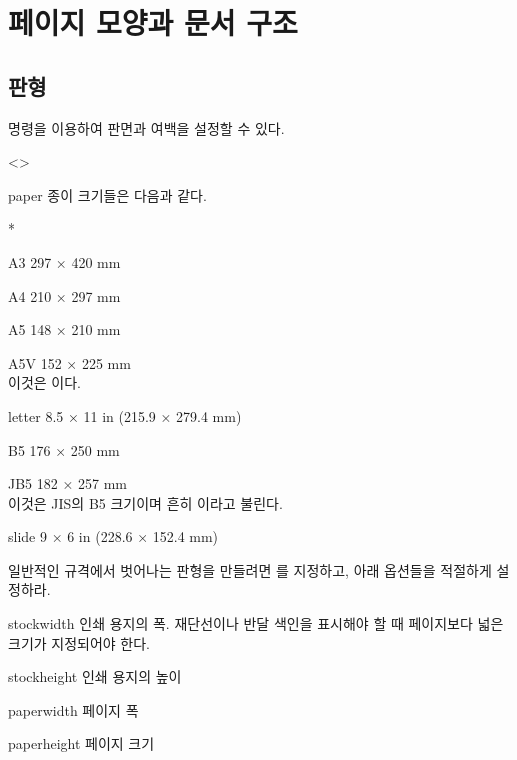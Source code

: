 \documentclass[minted]{hzguide}
\begin{document}
\ChapterContentsEnable

\chapter{페이지 모양과 문서 구조}

\section{판형}
\label{sec:layout}

\macro{\LayoutSetup} 명령을 이용하여 판면과 여백을 설정할 수 있다.

\begin{code}
\end{code}

\begin{macros}<\LayoutSetup>
\item[paper] 
종이 크기들은 다음과 같다.
\begin{macros}*
\item[A3] 297 × 420 mm 
\item[A4] 210 × 297 mm 
\item[A5] 148 × 210 mm 
\item[A5V] 152 × 225 mm \\ 이것은 이다.
\item[letter] 8.5 × 11 in (215.9 × 279.4 mm)
\item[B5] 176 × 250 mm
\item[JB5] 182 × 257 mm \\ 이것은 JIS의 B5 크기이며 흔히 이라고 불린다.
\item[slide] 9 × 6 in (228.6 × 152.4 mm)
\end{macros}

일반적인 규격에서 벗어나는 판형을 만들려면 를 지정하고, 아래 옵션들을 적절하게 설정하라.

\item[stockwidth] \keyvalue{250mm}
인쇄 용지의 폭. 재단선이나 반달 색인을 표시해야 할 때 페이지보다 넓은 크기가 지정되어야 한다.

\item[stockheight] \keyvalue{353mm}
인쇄 용지의 높이

\item[paperwidth] \keyvalue{210mm}
페이지 폭

\item[paperheight] \keyvalue{297mm}
페이지 크기


\end{macros}
\end{document}
